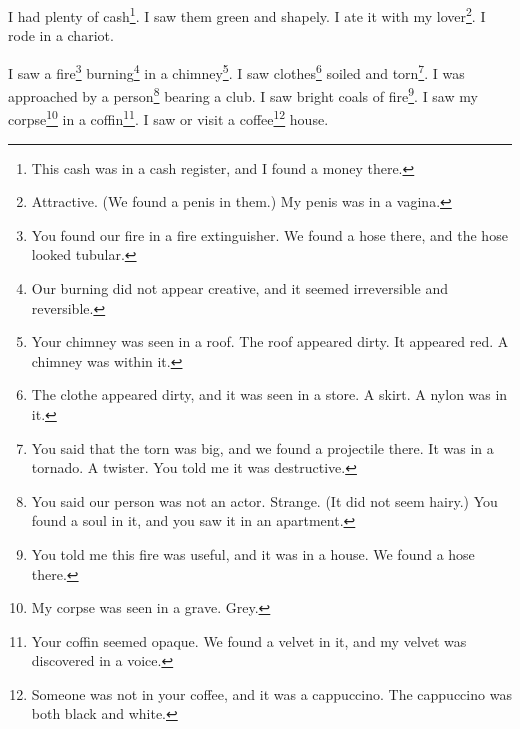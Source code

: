 \documentclass[12pt]{book}
\begin{document}
 I had plenty of cash\footnote{This cash was in a cash register, and I found a money there.}. I saw them green and shapely. I ate it with my lover\footnote{Attractive. (We found a penis in them.) My penis was in a vagina.}. I rode in a chariot. 

 I saw a fire\footnote{You found our fire in a fire extinguisher. We found a hose there, and the hose looked tubular.} burning\footnote{Our burning did not appear creative, and it seemed irreversible and reversible.} in a chimney\footnote{Your chimney was seen in a roof. The roof appeared dirty. It appeared red. A chimney was within it.}. I saw clothes\footnote{The clothe appeared dirty, and it was seen in a store. A skirt. A nylon was in it.} soiled and torn\footnote{You said that the torn was big, and we found a projectile there. It was in a tornado. A twister. You told me it was destructive.}. I was approached by a person\footnote{You said our person was not an actor. Strange. (It did not seem hairy.) You found a soul in it, and you saw it in an apartment.} bearing a club. I saw bright coals of fire\footnote{You told me this fire was useful, and it was in a house. We found a hose there.}. I saw my corpse\footnote{My corpse was seen in a grave. Grey.} in a coffin\footnote{Your coffin seemed opaque. We found a velvet in it, and my velvet was discovered in a voice.}. I saw or visit a coffee\footnote{Someone was not in your coffee, and it was a cappuccino. The cappuccino was both black and white.} house. 
\end{document}
